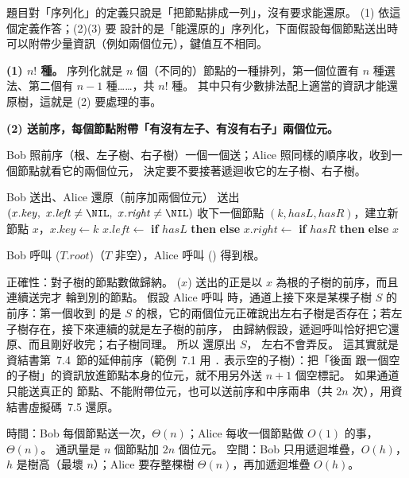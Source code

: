 \begin{pastsoln}
題目對「序列化」的定義只說是「把節點排成一列」，沒有要求能還原。 (1) 依這個定義作答；(2)(3) 要
設計的是「能還原的」序列化，下面假設每個節點送出時可以附帶少量資訊（例如兩個位元），鍵值互不相同。

\textbf{(1) $n!$ 種。} 序列化就是 $n$ 個（不同的）節點的一種排列，第一個位置有 $n$ 種選法、第二個有
$n - 1$ 種……，共 $n!$ 種。 其中只有少數排法配上適當的資訊才能還原樹，這就是 (2) 要處理的事。

\textbf{(2) 送前序，每個節點附帶「有沒有左子、有沒有右子」兩個位元。}

Bob 照前序（根、左子樹、右子樹）一個一個送；Alice 照同樣的順序收，收到一個節點就看它的兩個位元，
決定要不要接著遞迴收它的左子樹、右子樹。

\begin{pseudo}{Bob 送出、Alice 還原（前序加兩個位元）}
    \State 送出 $(x.\mathit{key},\ x.\mathit{left} \ne \NIL,\ x.\mathit{right} \ne \NIL)$
        \State {}
    \EndIf
        \State {}
    \EndIf
\EndProcedure
\Statex
{}
    \State 收下一個節點 $(k, \mathit{hasL}, \mathit{hasR})$，建立新節點 $x$，$x.\mathit{key} \gets k$
    \State $x.\mathit{left} \gets$ \textbf{if} $\mathit{hasL}$ \textbf{then}  \textbf{else} \NIL
    \State $x.\mathit{right} \gets$ \textbf{if} $\mathit{hasR}$ \textbf{then}  \textbf{else} \NIL
    \State \Return $x$
\EndFunction
\end{pseudo}
Bob 呼叫 ($T.\mathit{root}$)（$T$ 非空），Alice 呼叫 () 得到根。

正確性：對子樹的節點數做歸納。 ($x$) 送出的正是以 $x$ 為根的子樹的前序，而且連續送完才
輪到別的節點。 假設 Alice 呼叫  時，通道上接下來是某棵子樹 $S$ 的前序：第一個收到
的是 $S$ 的根，它的兩個位元正確說出左右子樹是否存在；若左子樹存在，接下來連續的就是左子樹的前序，
由歸納假設，遞迴呼叫恰好把它還原、而且剛好收完；右子樹同理。 所以  還原出 $S$，
左右不會弄反。 這其實就是資結書第~7.4~節的延伸前序（範例~7.1 用 \texttt{.} 表示空的子樹）：把「後面
跟一個空的子樹」的資訊放進節點本身的位元，就不用另外送 $n + 1$ 個空標記。 如果通道只能送真正的
節點、不能附帶位元，也可以送前序和中序兩串（共 $2n$ 次），用資結書虛擬碼~7.5 還原。

時間：Bob 每個節點送一次，$\Theta(n)$；Alice 每收一個節點做 $O(1)$ 的事，$\Theta(n)$。 通訊量是
$n$ 個節點加 $2n$ 個位元。 空間：Bob 只用遞迴堆疊，$O(h)$，$h$ 是樹高（最壞 $n$）；Alice 要存整棵樹
$\Theta(n)$，再加遞迴堆疊 $O(h)$。


\end{pastsoln}
